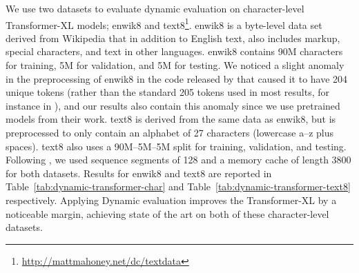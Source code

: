 \documentclass{article} \usepackage{iclr2018_conference,times}
\begin{document}
We use two datasets to evaluate dynamic evaluation on character-level Transformer-XL models; enwik8 \citep{Hutter-2006} and text8\footnote{\url{http://mattmahoney.net/dc/textdata}}. enwik8 is a byte-level data set derived from Wikipedia that in addition to English text, also includes markup, special characters, and text in other languages. enwik8 contains 90M characters for training, 5M for validation, and 5M for testing. We noticed a slight anomaly in the preprocessing of enwik8 in the code released by \citet{dai2019} that caused it to have 204 unique tokens (rather than the standard 205 tokens used in most results, for instance in \citet{Graves-2013}), and our results also contain this anomaly since we use pretrained models from their work. text8 is derived from the same data as enwik8, but is preprocessed to only contain an alphabet of 27 characters (lowercase a--z plus spaces). text8 also uses a 90M--5M--5M split for training, validation, and testing. Following \citet{dai2019}, we used sequence segments of 128 and a memory cache of length 3800 for both datasets. Results for enwik8 and text8 are reported in Table~\ref{tab:dynamic-transformer-char} and Table~\ref{tab:dynamic-transformer-text8} respectively. Applying Dynamic evaluation improves the Transformer-XL by a noticeable margin, achieving state of the art on both of these character-level datasets.
\end{document}
